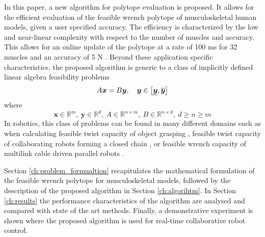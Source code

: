 In this paper, a new algorithm for polytope evaluation is proposed. It allows for the efficient evaluation of the feasible wrench polytope of musculoskeletal human models, given a user specified accuracy. The efficiency is characterized by the low and near-linear complexity with respect to the number of muscles and accuracy. This allows for an online update of the polytope at a rate of 100 ms  for 32 muscles and an accuracy of 5 N . Beyond these application specific characteristics, the proposed algorithm is generic to a class of implicitly defined linear algebra feasibility problems
\begin{equation}
    A\bm{x} = B\bm{y},\quad  \bm{y}\in \left[\underline{{\bm{y}}}, \overline{{\bm{y}}}\right]
    \label{eq:eq_general}
\end{equation}
where 
\begin{equation}
   \bm{x} \in \mathbb{R}^m, ~\bm{y} \in \mathbb{R}^d, ~A\in\mathbb{R}^{n \times m}, ~B\in\mathbb{R}^{n \times d}, ~ d\geq n \!\geq\! m
\end{equation}
In robotics, this class of problems can be found in many different domains such as when calculating feasible twist capacity of object grasping \cite{Prattichizzo2016}, feasible twist capacity of collaborating robots forming a closed chain \cite{bicchi2000manipulability}, or feasible wrench capacity of multilink cable driven parallel robots \cite{lau2016caspr}\cite{sheng2020operational}. %

Section \ref{ch:problem_formualtion} recapitulates the mathematical formulation of the feasible wrench polytope for musculoskeletal models, followed by the description of the proposed algorithm in Section \ref{ch:algorihtm}. In Section \ref{ch:results} the performance characteristics of the algorithm are analysed and compared with state of the art methods. Finally, a demonstrative experiment is shown where the proposed algorithm is used for real-time collaborative robot control. 


